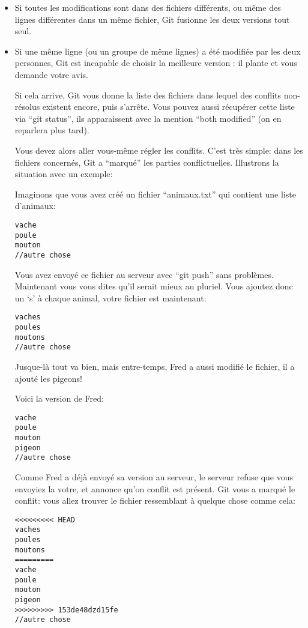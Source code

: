 \documentclass[10pt,a4paper]{article}
\begin{document}
\begin{itemize}
\item Si toutes les modifications sont dans des fichiers différents, ou même des lignes différentes dans un même fichier, Git fusionne les deux versions tout seul.
\item Si une même ligne (ou un groupe de même lignes) a été modifiée par les deux personnes, Git est incapable de choisir la meilleure version : il plante et vous demande votre avis.

Si cela arrive, Git vous donne la liste des fichiers dans lequel des conflits non-résolus existent encore, puis s'arrête. Vous pouvez aussi récupérer cette liste via ``git status'', ils apparaissent avec la mention ``both modified'' (on en reparlera plus tard).

Vous devez alors aller vous-même régler les conflits. C'est très simple: dans les fichiers concernés, Git a ``marqué'' les parties conflictuelles. Illustrons la situation avec un exemple:

Imaginons que vous avez créé un fichier ``animaux.txt'' qui contient une liste d'animaux:

\begin{verbatim}
vache
poule
mouton
//autre chose
\end{verbatim}

Vous avez envoyé ce fichier au serveur avec ``git push'' sans problèmes. Maintenant vous vous dites qu'il serait mieux au pluriel. Vous ajoutez donc un `s' à chaque animal, votre fichier est maintenant:

\begin{verbatim}
vaches
poules
moutons
//autre chose
\end{verbatim}

Jusque-là tout va bien, mais entre-temps, Fred a aussi modifié le fichier, il a ajouté les pigeons!

Voici la version de Fred:

\begin{verbatim}
vache
poule
mouton
pigeon
//autre chose
\end{verbatim}

Comme Fred a déjà envoyé sa version au serveur, le serveur refuse que vous envoyiez la votre, et annonce qu'on conflit est présent. Git vous a marqué le conflit: vous allez trouver le fichier ressemblant à quelque chose comme cela:

\begin{verbatim}
<<<<<<<<< HEAD
vaches
poules
moutons
=========
vache
poule
mouton
pigeon
>>>>>>>>> 153de48dzd15fe
//autre chose
\end{verbatim}


\end{itemize}
\end{document}
